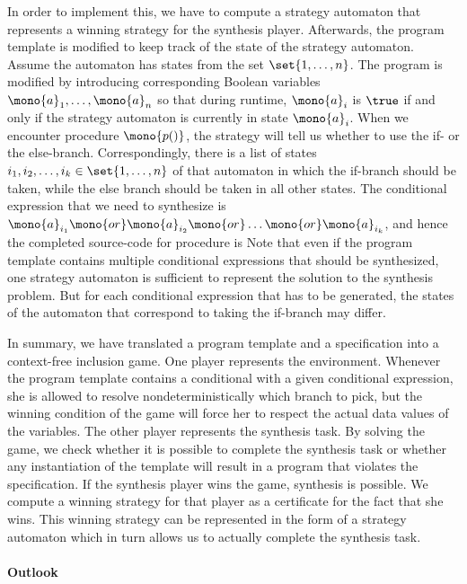 \documentclass[../../diss.tex]{subfiles}
\begin{document}
In order to implement this, we have to compute a strategy automaton that represents a winning strategy for the synthesis player.
Afterwards, the program template is modified to keep track of the state of the strategy automaton.
Assume the automaton has states from the set $\set{1, \ldots, n}$.
The program is modified by introducing corresponding Boolean variables $\mono{a}_1, \ldots, \mono{a}_n$ so that during runtime, $\mono{a}_i$ is $\true$ if and only if the strategy automaton is currently in state $\mono{a}_i$.
When we encounter procedure $\mono{p()}$, the strategy will tell us whether to use the if- or the else-branch.
Correspondingly, there is a list of states $i_1, i_2, \ldots, i_k \in \set{1, \ldots, n}$ of that automaton in which the if-branch should be taken, while the else branch should be taken in all other states.
The conditional expression that we need to synthesize is $\mono{a}_{i_1} \mono{ or } \mono{a}_{i_2} \mono{ or } \ldots \mono{ or } \mono{a}_{i_k}$, and hence the completed source-code for procedure  is 
Note that even if the program template contains multiple conditional expressions that should be synthesized, one strategy automaton is sufficient to represent the solution to the synthesis problem.
But for each conditional expression that has to be generated, the states of the automaton that correspond to taking the if-branch may differ.

In summary, we have translated a program template and a specification into a context-free inclusion game.
One player represents the environment.
Whenever the program template contains a conditional with a given conditional expression, she is allowed to resolve nondeterministically which branch to pick, but the winning condition of the game will force her to respect the actual data values of the variables.
The other player represents the synthesis task.
By solving the game, we check whether it is possible to complete the synthesis task or whether any instantiation of the template will result in a program that violates the specification.
If the synthesis player wins the game, synthesis is possible.
We compute a winning strategy for that player as a certificate for the fact that she wins.
This winning strategy can be represented in the form of a strategy automaton which in turn allows us to actually complete the synthesis task.

\paragraph{Outlook}
\end{document}
